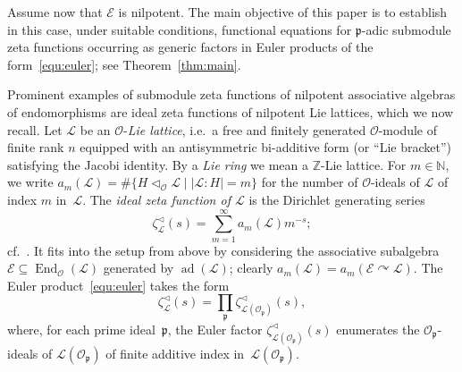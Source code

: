 \documentclass[11pt]{amsart}
\numberwithin{equation}{section}
\numberwithin{figure}{section}
\theoremstyle{plain}
\theoremstyle{definition}
\theoremstyle{remark}
\begin{document}
Assume now that ${\mathcal{E}}$ is nilpotent. The main objective of this paper
is to establish in this case, under suitable conditions, functional
equations for ${\mathfrak{p}}$-adic submodule zeta functions occurring as
generic factors in Euler products of the form~\eqref{equ:euler}; see
Theorem~\ref{thm:main}.

Prominent examples of submodule zeta functions of nilpotent
associative algebras of endomorphisms are ideal zeta functions of
nilpotent Lie lattices, which we now recall. Let ${\ensuremath{\mathcal{L}}}$ be an
${\ensuremath{\mathcal{O}}}$-\emph{Lie lattice}, i.e.\ a free and finitely generated
${\ensuremath{\mathcal{O}}}$-module of finite rank $n$ equipped with an antisymmetric
bi-additive form (or ``Lie bracket'') satisfying the Jacobi
identity. By a \emph{Lie ring} we mean a ${\ensuremath{\mathbb{Z}}}$-Lie lattice. For
$m\in{\ensuremath{\mathbb{N}}}$, we write $a_m({\ensuremath{\mathcal{L}}}) = \#\{ H {\triangleleft}_{\ensuremath{\mathcal{O}}} {\ensuremath{\mathcal{L}}} \mid
|{\ensuremath{\mathcal{L}}}:H|=m\}$ for the number of ${\ensuremath{\mathcal{O}}}$-ideals of ${\ensuremath{\mathcal{L}}}$ of index $m$
in~${\ensuremath{\mathcal{L}}}$. The \emph{ideal zeta function of ${\ensuremath{\mathcal{L}}}$} is the Dirichlet
generating series $$\zeta^{\triangleleft}_{\ensuremath{\mathcal{L}}}(s) = \sum_{m=1}^\infty
a_m({\ensuremath{\mathcal{L}}}) m^{-s};$$ cf.\ \cite[Section~3]{GSS/88}. It fits into the
setup from above by considering the associative subalgebra ${\mathcal{E}}
\subseteq\operatorname{End}_{\ensuremath{\mathcal{O}}}({\ensuremath{\mathcal{L}}})$ generated by $\operatorname{ad}({\ensuremath{\mathcal{L}}})$; clearly $a_m({\ensuremath{\mathcal{L}}})
= a_m({\mathcal{E}} {\curvearrowright} {\ensuremath{\mathcal{L}}})$. The Euler product~\eqref{equ:euler} takes the
form
$$\zeta^{\triangleleft}_{\ensuremath{\mathcal{L}}}(s) =
\prod_{\mathfrak{p}}\zeta^{\triangleleft}_{{\ensuremath{\mathcal{L}}}({\ensuremath{\mathcal{O}}}_{\mathfrak{p}})}(s),$$ where, for each
prime ideal~${\mathfrak{p}}$, the Euler factor
$\zeta^{\triangleleft}_{{\ensuremath{\mathcal{L}}}({\ensuremath{\mathcal{O}}}_{\mathfrak{p}})}(s)$ enumerates the
${\ensuremath{\mathcal{O}}}_{\mathfrak{p}}$-ideals of ${\ensuremath{\mathcal{L}}}({\ensuremath{\mathcal{O}}}_{\mathfrak{p}})$ of finite additive index
in~${\ensuremath{\mathcal{L}}}({\ensuremath{\mathcal{O}}}_{\mathfrak{p}})$.
\end{document}
